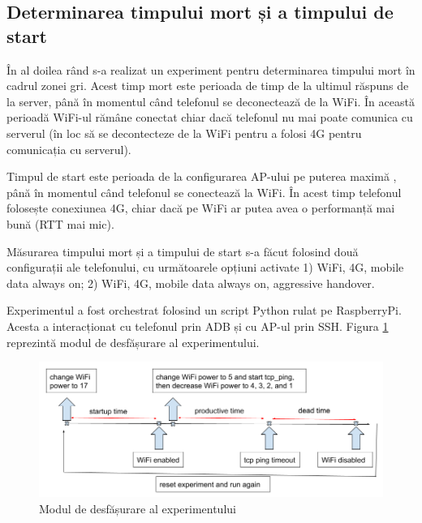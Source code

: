 \subsection{Determinarea timpului mort și a timpului de start}

În al doilea rând s-a realizat un experiment pentru determinarea timpului mort în cadrul zonei gri. Acest timp mort este perioada de timp de la ultimul răspuns de la server, până în momentul când telefonul se deconectează de la WiFi. În această perioadă WiFi-ul rămâne conectat chiar dacă telefonul nu mai poate comunica cu serverul (în loc să se decontecteze de la WiFi pentru a folosi 4G pentru comunicația cu serverul).

Timpul de start este perioada de la configurarea AP-ului pe puterea maximă , până în momentul când telefonul se conectează la WiFi. În acest timp telefonul folosește conexiunea 4G, chiar dacă pe WiFi ar putea avea o performanță mai bună (RTT mai mic).

Măsurarea timpului mort și a timpului de start s-a făcut folosind două configurații ale telefonului, cu următoarele opțiuni activate 1) WiFi, 4G, mobile data always on; 2) WiFi, 4G, mobile data always on, aggressive handover. 

Experimentul a fost orchestrat folosind un script Python rulat pe RaspberryPi. Acesta a interacționat cu telefonul prin ADB și cu AP-ul prin SSH. Figura \ref{fig:expdesign} reprezintă modul de desfășurare al experimentului. 

\begin{figure}[h!]
	\centering
	\includegraphics[scale=0.5]{figures/experiments/experiment_design.png}
	\caption{Modul de desfășurare al experimentului}
    	\label{fig:expdesign}
\end{figure}

